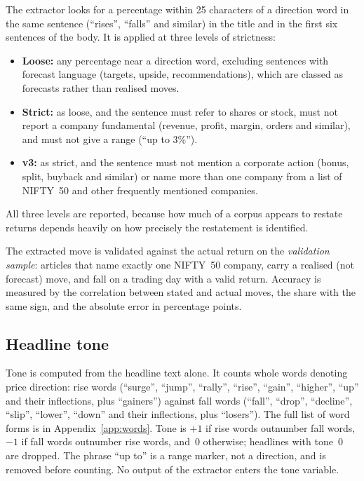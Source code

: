 \documentclass[11pt]{article}
\begin{document}
The extractor looks for a percentage within 25 characters of a direction word in the same sentence (``rises'', ``falls'' and similar) in the title and in the first six sentences of the body. It is applied at three levels of strictness:
\begin{itemize}
  \item \textbf{Loose:} any percentage near a direction word, excluding sentences with forecast language (targets, upside, recommendations), which are classed as forecasts rather than realised moves.
  \item \textbf{Strict:} as loose, and the sentence must refer to shares or stock, must not report a company fundamental (revenue, profit, margin, orders and similar), and must not give a range (``up to 3\%'').
  \item \textbf{v3:} as strict, and the sentence must not mention a corporate action (bonus, split, buyback and similar) or name more than one company from a list of NIFTY~50 and other frequently mentioned companies.
\end{itemize}
All three levels are reported, because how much of a corpus appears to restate returns depends heavily on how precisely the restatement is identified.

The extracted move is validated against the actual return on the \emph{validation sample}: articles that name exactly one NIFTY~50 company, carry a realised (not forecast) move, and fall on a trading day with a valid return. Accuracy is measured by the correlation between stated and actual moves, the share with the same sign, and the absolute error in percentage points.

\subsection{Headline tone}

Tone is computed from the headline text alone. It counts whole words denoting price direction: rise words (``surge'', ``jump'', ``rally'', ``rise'', ``gain'', ``higher'', ``up'' and their inflections, plus ``gainers'') against fall words (``fall'', ``drop'', ``decline'', ``slip'', ``lower'', ``down'' and their inflections, plus ``losers''). The full list of \nWordForms{} word forms is in Appendix~\ref{app:words}. Tone is $+1$ if rise words outnumber fall words, $-1$ if fall words outnumber rise words, and~0 otherwise; headlines with tone~0 are dropped. The phrase ``up to'' is a range marker, not a direction, and is removed before counting. No output of the extractor enters the tone variable.
\end{document}
